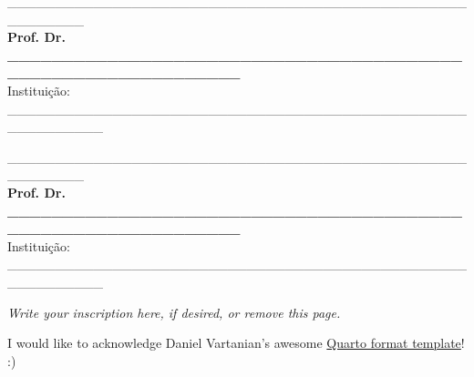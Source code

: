 \begin{folhadeaprovacao}
\begin{center}
\vspace*{2cm}

\_\_\_\_\_\_\_\_\_\_\_\_\_\_\_\_\_\_\_\_\_\_\_\_\_\_\_\_\_\_\_\_\_\_\_\_\_\_\_\_\_\_\_\_\_\_\_\_\_\_\_\_\_\_\_\_
\vspace*{0.2cm}
\\ \textbf{Prof. Dr. \_\_\_\_\_\_\_\_\_\_\_\_\_\_\_\_\_\_\_\_\_\_\_\_\_\_\_\_\_\_\_\_\_\_\_\_\_\_\_\_\_\_\_\_\_\_\_\_\_\_\_\_\_\_\_\_\_\_\_\_\_\_}
\\ \vspace*{0.2cm}
Instituição: \_\_\_\_\_\_\_\_\_\_\_\_\_\_\_\_\_\_\_\_\_\_\_\_\_\_\_\_\_\_\_\_\_\_\_\_\_\_\_\_\_\_\_\_\_\_\_\_\_\_\_\_\_\_\_\_\_\_

\vspace*{2cm}

\_\_\_\_\_\_\_\_\_\_\_\_\_\_\_\_\_\_\_\_\_\_\_\_\_\_\_\_\_\_\_\_\_\_\_\_\_\_\_\_\_\_\_\_\_\_\_\_\_\_\_\_\_\_\_\_
\vspace*{0.2cm}
\\ \textbf{Prof. Dr. \_\_\_\_\_\_\_\_\_\_\_\_\_\_\_\_\_\_\_\_\_\_\_\_\_\_\_\_\_\_\_\_\_\_\_\_\_\_\_\_\_\_\_\_\_\_\_\_\_\_\_\_\_\_\_\_\_\_\_\_\_\_}
\\ \vspace*{0.2cm}
Instituição: \_\_\_\_\_\_\_\_\_\_\_\_\_\_\_\_\_\_\_\_\_\_\_\_\_\_\_\_\_\_\_\_\_\_\_\_\_\_\_\_\_\_\_\_\_\_\_\_\_\_\_\_\_\_\_\_\_\_

\end{center}
\end{folhadeaprovacao}


\begin{dedicatoria}
  \vspace*{\fill}
  \centering
  \noindent
  \textit{
    Write your inscription here, if desired, or remove this page.
  }
	\vspace*{\fill}
\end{dedicatoria}


\begin{agradecimentos}
  I would like to acknowledge Daniel Vartanian's awesome \href{https://github.com/danielvartan/tesesusp}{Quarto format template}! :)
\end{agradecimentos}


